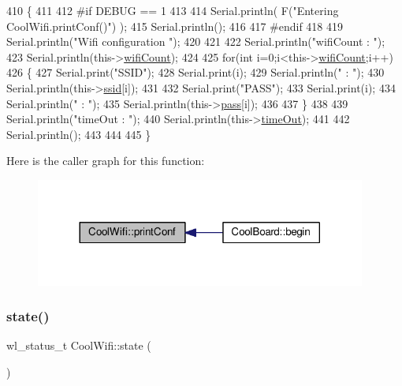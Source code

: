 \begin{DoxyCode}
410 \{
411 
412 \textcolor{preprocessor}{#if DEBUG == 1 }
413 
414     Serial.println( F(\textcolor{stringliteral}{"Entering CoolWifi.printConf()"}) );
415     Serial.println();   
416 
417 \textcolor{preprocessor}{#endif}
418     
419     Serial.println(\textcolor{stringliteral}{"Wifi configuration "});
420 
421     
422     Serial.println(\textcolor{stringliteral}{"wifiCount : "});
423     Serial.println(this->\hyperlink{classCoolWifi_ab133bd92fcb895b884deecd6678592e4}{wifiCount});
424     
425     \textcolor{keywordflow}{for}(\textcolor{keywordtype}{int} i=0;i<this->\hyperlink{classCoolWifi_ab133bd92fcb895b884deecd6678592e4}{wifiCount};i++)
426     \{   
427         Serial.print(\textcolor{stringliteral}{"SSID"});
428         Serial.print(i);
429         Serial.println(\textcolor{stringliteral}{" : "});
430         Serial.println(this->\hyperlink{classCoolWifi_a893b21d0fed821438733bba2e73fb4c2}{ssid}[i]);
431                 
432         Serial.print(\textcolor{stringliteral}{"PASS"});
433         Serial.print(i);
434         Serial.println(\textcolor{stringliteral}{" : "});
435         Serial.println(this->\hyperlink{classCoolWifi_a0c3332a149245aaad060b32593a54c9b}{pass}[i]);
436         
437     \}
438     
439     Serial.println(\textcolor{stringliteral}{"timeOut : "});
440     Serial.println(this->\hyperlink{classCoolWifi_a952111605f25156588b5632caaba1c6f}{timeOut});
441 
442     Serial.println();
443 
444 
445 \}
\end{DoxyCode}
Here is the caller graph for this function\+:\nopagebreak
\begin{figure}[H]
\begin{center}
\leavevmode
\includegraphics[width=308pt]{classCoolWifi_a9e6105c6d13d35ec510f6633da9e0223_icgraph}
\end{center}
\end{figure}
\mbox{\label{classCoolWifi_a1c7b4d82a4098d346e7593dce92039fa}} 
\subsubsection{\texorpdfstring{state()}{state()}}
{\footnotesize\ttfamily wl\+\_\+status\+\_\+t Cool\+Wifi\+::state (\begin{DoxyParamCaption}{ }\end{DoxyParamCaption})}

